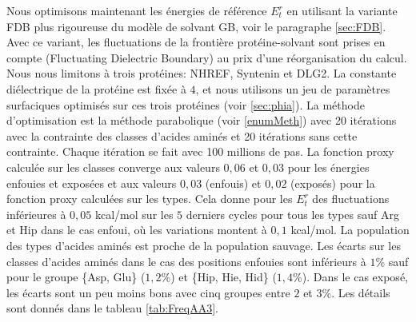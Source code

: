 Nous optimisons maintenant les énergies de référence $E_t^r$ en utilisant la variante FDB plus rigoureuse du modèle de solvant GB, voir le paragraphe \ref{sec:FDB}. Avec ce variant, les fluctuations de la frontière protéine-solvant sont prises en compte (\og Fluctuating Dielectric Boundary\fg) au prix d'une réorganisation du calcul. Nous nous limitons à trois protéines: NHREF, Syntenin et DLG2. La constante diélectrique de la protéine est fixée à $4$, et nous utilisons un jeu de paramètres surfaciques optimisés sur ces trois protéines (voir \ref{sec:phia}). La méthode d'optimisation est la méthode parabolique (voir \ref{enumMeth}) avec 20 itérations avec la contrainte des classes d'acides aminés et 20 itérations sans cette contrainte. Chaque itération se fait avec 100 millions de pas. La fonction proxy calculée sur les classes converge aux valeurs $0,06$ et $0,03$ pour les énergies enfouies et exposées et aux valeurs $0,03$ (enfouis) et $0,02$ (exposés) pour la fonction proxy calculées sur les types. Cela donne pour les $E_t^r$ des fluctuations inférieures à $0,05$ kcal/mol sur les $5$ derniers cycles pour tous les types sauf Arg et Hip dans le cas enfoui, où les variations montent à $0,1$ kcal/mol. La population des types d'acides aminés est proche de la population sauvage. Les écarts sur les classes d'acides aminés dans le cas des positions enfouies sont inférieurs à $1$\%  sauf pour le groupe \{Asp, Glu\} ($1,2$\%)  et \{Hip, Hie, Hid\} ($1,4$\%). Dans le cas exposé, les écarts sont un peu moins bons avec cinq groupes entre $2$ et $3$\%. Les détails sont donnés dans le tableau \ref{tab:FreqAA3}.

